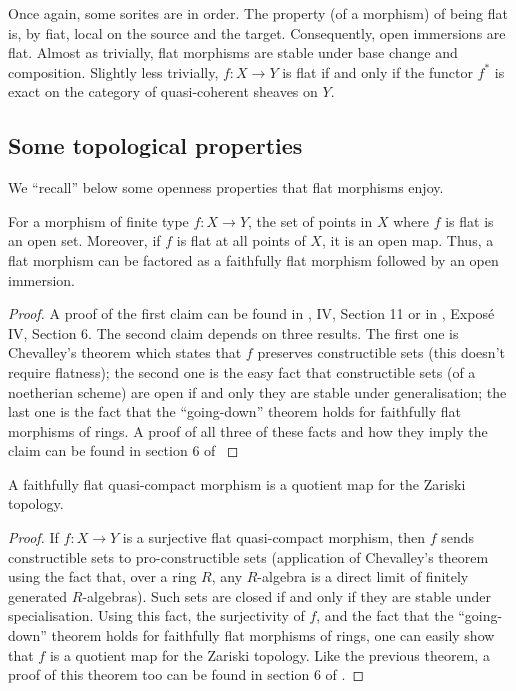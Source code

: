 \noindent
Once again, some sorites are in order. The property (of a morphism) of being
flat is, by fiat, local on the source and the target. Consequently, open
immersions are flat. Almost as trivially, flat morphisms are stable under
base change and composition. Slightly less trivially, $f:X \to Y$ is flat if
and only if the functor $f^*$ is exact on the category of quasi-coherent
sheaves on $Y$. 

\subsection{Some topological properties}
\label{subsection-topological-flat}

\noindent
We ``recall'' below some openness properties that flat morphisms enjoy.

\begin{theorem}
\label{theorem-flat-open}
For a morphism of finite type $f:X \to Y$, the set of points in $X$ where $f$
is flat is an open set. Moreover, if $f$ is flat at all points of $X$, it is
an open map. Thus, a flat morphism can be factored as a faithfully flat
morphism followed by an open immersion.
\end{theorem}

\begin{proof}
A proof of the first claim can be found in \cite{EGA}, IV, Section 11 or in
\cite{SGA1}, Expos\'e IV, Section 6. The second claim depends on three
results. The first one is Chevalley's theorem which states that $f$ preserves
constructible sets (this doesn't require flatness); the second one is the
easy fact that constructible sets (of a noetherian scheme) are open if and
only they are stable under generalisation; the last one is the fact that the
``going-down'' theorem holds for faithfully flat morphisms of rings. A proof
of all three of these facts and how they imply the claim can be found in
section 6 of \cite{MatCA} 
\end{proof}

\begin{theorem}
\label{theorem-flat-is-quotient}
A faithfully flat quasi-compact morphism is a quotient map for
the Zariski topology.
\end{theorem}

\begin{proof}
If $f:X \to Y$ is a surjective flat quasi-compact morphism, then $f$ sends
constructible sets to pro-constructible sets (application of Chevalley's
theorem using the fact that, over a ring $R$, any $R$-algebra is a direct
limit of finitely generated $R$-algebras). Such sets are closed if and only
if they are stable under specialisation. Using this fact, the surjectivity
of $f$, and the fact that the ``going-down'' theorem holds for faithfully
flat morphisms of rings, one can easily show that $f$ is a quotient map for
the Zariski topology. Like the previous theorem, a proof of this theorem too
can be found in section 6 of \cite{MatCA}.
\end{proof}

